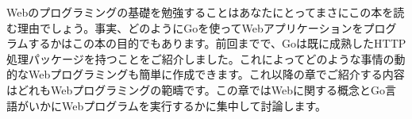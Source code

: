Webのプログラミングの基礎を勉強することはあなたにとってまさにこの本を読む理由でしょう。事実、どのようにGoを使ってWebアプリケーションをプログラムするかはこの本の目的でもあります。前回までで、Goは既に成熟したHTTP処理パッケージを持つことをご紹介しました。これによってどのような事情の動的なWebプログラミングも簡単に作成できます。これ以降の章でご紹介する内容はどれもWebプログラミングの範疇です。この章ではWebに関する概念とGo言語がいかにWebプログラムを実行するかに集中して討論します。
